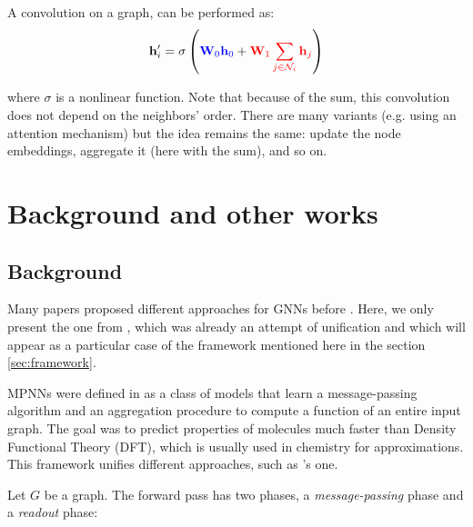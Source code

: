 \documentclass{article}
\begin{document}
A convolution on a graph, can be performed as:
\begin{equation*}
    \mathbf{h}_i' = \sigma \left( \textcolor{blue}{\mathbf{W}_0 \mathbf{h}_0} + \textcolor{red}{\mathbf{W}_1 \sum_{j \in \mathcal{N}_i} \mathbf{h}_j} \right)
\end{equation*}

where $\sigma$ is a nonlinear function. Note that because of the sum, this convolution does not depend on the neighbors' order. There are many variants (e.g. using an attention mechanism) but the idea remains the same: update the node embeddings, aggregate it (here with the sum), and so on.


\section{Background and other works}
\label{sec:background-otherworks}

    \subsection{Background}
    \label{subsec:background}

Many papers proposed different approaches for GNNs before \cite[Battaglia et al. 2018]{battaglia2018relational}. Here, we only present the one from \cite[Gilmer et al. 2017]{gilmer2017neural}, which was already an attempt of unification and which will appear as a particular case of the framework mentioned here in the section \ref{sec:framework}.
    

MPNNs were defined in \cite[Gilmer et al. 2017]{gilmer2017neural} as a class of models that learn a message-passing algorithm and an aggregation procedure to compute a function of an entire input graph. The goal was to predict properties of molecules much faster than Density Functional Theory (DFT), which is usually used in chemistry for approximations. This framework unifies different approaches, such as \cite[Kipf et al. 2016]{kipf2016semisupervised}'s one.

Let $G$ be a graph. The forward pass has two phases, a \emph{message-passing} phase and a \emph{readout} phase:
\end{document}
